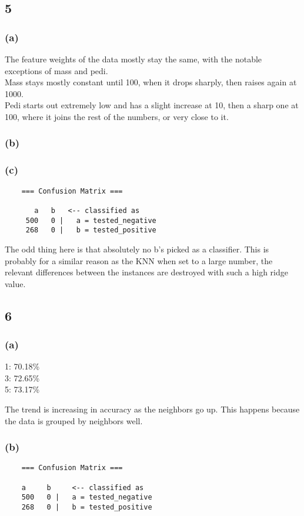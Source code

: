 \documentclass[12pt]{article}
\begin{document}
	\subsection*{5}
	\subsubsection*{(a)}
    The feature weights of the data mostly stay the same, with the notable exceptions of mass and pedi. \\
    Mass stays mostly constant until 100, when it drops sharply, then raises again at 1000.\\
    Pedi starts out extremely low and has a slight increase at 10, then a sharp one at 100, where it joins the rest of the numbers, or very close to it.

	\subsubsection*{(b)}
	
	\subsubsection*{(c)}
	\begin{verbatim}	
	=== Confusion Matrix ===

	   a   b   <-- classified as
	 500   0 |   a = tested_negative
	 268   0 |   b = tested_positive
	\end{verbatim}
	
	The odd thing here is that absolutely no b's picked as a classifier. This is probably for a similar reason as the KNN when set to a large number, the relevant 
	differences between the instances are destroyed with such a high ridge value.
	
	
	\subsection*{6}
	\subsubsection*{(a)}
	1: 70.18\%\\
	3: 72.65\%\\
	5: 73.17\%
	
	The trend is increasing in accuracy as the neighbors go up. This happens because the data is grouped by neighbors well.
	
	\subsubsection*{(b)}
	\begin{verbatim}
	=== Confusion Matrix ===
	
	a     b     <-- classified as
	500   0 |   a = tested_negative
	268   0 |   b = tested_positive
	\end{verbatim}
	
\end{document}
